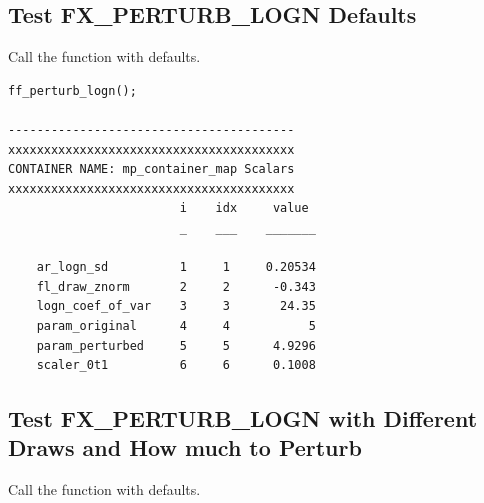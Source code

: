 \documentclass[
]{book}
\begin{document}
\hypertarget{test-fx_perturb_logn-defaults}{%
\subsection{Test FX\_PERTURB\_LOGN Defaults}\label{test-fx_perturb_logn-defaults}}

Call the function with defaults.

\begin{verbatim}
ff_perturb_logn();

----------------------------------------
xxxxxxxxxxxxxxxxxxxxxxxxxxxxxxxxxxxxxxxx
CONTAINER NAME: mp_container_map Scalars
xxxxxxxxxxxxxxxxxxxxxxxxxxxxxxxxxxxxxxxx
                        i    idx     value 
                        _    ___    _______

    ar_logn_sd          1     1     0.20534
    fl_draw_znorm       2     2      -0.343
    logn_coef_of_var    3     3       24.35
    param_original      4     4           5
    param_perturbed     5     5      4.9296
    scaler_0t1          6     6      0.1008
\end{verbatim}

\hypertarget{test-fx_perturb_logn-with-different-draws-and-how-much-to-perturb}{%
\subsection{Test FX\_PERTURB\_LOGN with Different Draws and How much to Perturb}\label{test-fx_perturb_logn-with-different-draws-and-how-much-to-perturb}}

Call the function with defaults.
\end{document}
